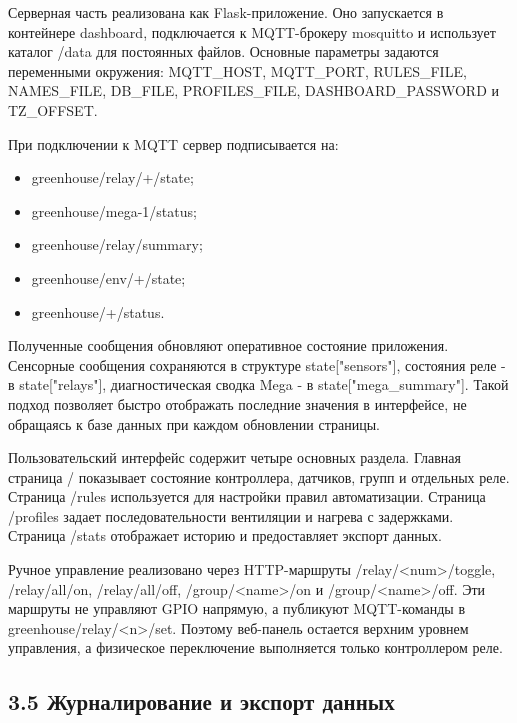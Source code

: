 \documentclass[a4paper,14pt]{extarticle}
\renewcommand{\texttt}[1]{\textnormal{#1}}
\providecommand{\tightlist}{%
  \setlength{\itemsep}{0pt}\setlength{\parskip}{0pt}}
\begin{document}
Серверная часть реализована как Flask-приложение. Оно запускается в
контейнере \texttt{dashboard}, подключается к MQTT-брокеру
\texttt{mosquitto} и использует каталог \texttt{/data} для постоянных
файлов. Основные параметры задаются переменными окружения:
\texttt{MQTT\_HOST}, \texttt{MQTT\_PORT}, \texttt{RULES\_FILE},
\texttt{NAMES\_FILE}, \texttt{DB\_FILE}, \texttt{PROFILES\_FILE},
\texttt{DASHBOARD\_PASSWORD} и \texttt{TZ\_OFFSET}.

При подключении к MQTT сервер подписывается на:

\begin{itemize}
\tightlist
\item
  \texttt{greenhouse/relay/+/state};
\item
  \texttt{greenhouse/mega-1/status};
\item
  \texttt{greenhouse/relay/summary};
\item
  \texttt{greenhouse/env/+/state};
\item
  \texttt{greenhouse/+/status}.
\end{itemize}

Полученные сообщения обновляют оперативное состояние приложения.
Сенсорные сообщения сохраняются в структуре
\texttt{state{[}"sensors"{]}}, состояния реле - в
\texttt{state{[}"relays"{]}}, диагностическая сводка Mega - в
\texttt{state{[}"mega\_summary"{]}}. Такой подход позволяет быстро
отображать последние значения в интерфейсе, не обращаясь к базе данных
при каждом обновлении страницы.

Пользовательский интерфейс содержит четыре основных раздела. Главная
страница \texttt{/} показывает состояние контроллера, датчиков, групп и
отдельных реле. Страница \texttt{/rules} используется для настройки
правил автоматизации. Страница \texttt{/profiles} задает
последовательности вентиляции и нагрева с задержками. Страница
\texttt{/stats} отображает историю и предоставляет экспорт данных.

Ручное управление реализовано через HTTP-маршруты
\texttt{/relay/\textless{}num\textgreater{}/toggle},
\texttt{/relay/all/on}, \texttt{/relay/all/off},
\texttt{/group/\textless{}name\textgreater{}/on} и
\texttt{/group/\textless{}name\textgreater{}/off}. Эти маршруты не
управляют GPIO напрямую, а публикуют MQTT-команды в
\texttt{greenhouse/relay/\textless{}n\textgreater{}/set}. Поэтому
веб-панель остается верхним уровнем управления, а физическое
переключение выполняется только контроллером реле.

\subsection{3.5 Журналирование и экспорт
данных}\label{ux436ux443ux440ux43dux430ux43bux438ux440ux43eux432ux430ux43dux438ux435-ux438-ux44dux43aux441ux43fux43eux440ux442-ux434ux430ux43dux43dux44bux445}
\end{document}
